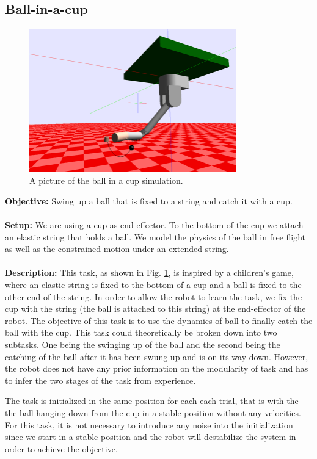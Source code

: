 \documentclass[11pt, article, colorback]{article}
\begin{document}
\subsection{Ball-in-a-cup}
\begin{figure}
\centering
 \includegraphics[width=0.8\textwidth]{Pics/BallInACup.png}
  \caption{A picture of the ball in a cup simulation.}
  \label{pic:biac}
\end{figure}
%
\textbf{Objective:} Swing up a ball that is fixed to a string and catch it with a cup. \\ \\
%
\textbf{Setup:}  We are using a cup as end-effector. To the bottom of the cup we attach an elastic string 
that holds a ball. We model the physics of the ball in free flight as well as the constrained motion under
an extended string.  \\ \\
%
\textbf{Description:}
This task, as shown in Fig. \ref{pic:biac}, is inspired by a children's game, where an elastic string is fixed to the bottom of a cup and a 
ball is fixed to the other end of the string. In order to allow the robot to learn the task, we fix the cup with the 
string (the ball is attached to this string) at the end-effector of the robot.
The objective of this task is to use the dynamics of ball to 
finally catch the ball with the cup. This task could theoretically be broken down into two subtasks. One being the 
swinging up of the ball and the second being the catching of the ball after it has been swung up and is on 
its way down. However, the robot does not have any prior information on the modularity of task and has to 
infer the two stages of the task from experience. 

The task is initialized in the same position for each each trial, that is with the the ball hanging down from the cup 
in a stable position without any velocities. For this task, it is not necessary to introduce any noise into 
the initialization since we start in a stable position and the robot will destabilize the system in order to achieve the objective. 
\end{document}
